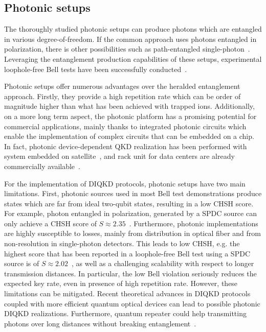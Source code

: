 \subsection{Photonic setups}

The thoroughly studied photonic setups can produce photons which are entangled in various degree-of-freedom.
If the common approach uses photons entangled in polarization, there is other possibilities such as path-entangled single-photon~\cite{Caspar2020}.
Leveraging the entanglement production capabilities of these setups, experimental loophole-free Bell tests have been successfully conducted~\cite{Giustina2015,Shalm2015,Li2018}.

Photonic setups offer numerous advantages over the heralded entanglement approach.
Firstly, they provide a high repetition rate which can be order of magnitude higher than what has been achieved with trapped ions.
Additionally, on a more long term aspect, the photonic platform has a promising potential for commercial applications, mainly thanks to integrated photonic circuits which enable the implementation of complex circuits that can be embedded on a chip.
In fact, photonic device-dependent QKD realization has been performed with system embedded on satellite~\cite{Liao2017}, and rack unit for data centers are already commercially available~\cite{Pljonkin2018}. 

For the implementation of DIQKD protocols, photonic setups have two main limitations.
First, photonic sources used in most Bell test demonstrations produce states which are far from ideal two-qubit states, resulting in a low CHSH score.
For example, photon entangled in polarization, generated by a SPDC source can only achieve a CHSH score of $S\approx 2.35$~\cite{Vivoli2015b}.
Furthermore, photonic implementations are highly susceptible to losses, mainly from distribution in optical fiber and from non-resolution in single-photon detectors.
This leads to low CHSH, e.g. the highest score that has been reported in a loophole-free Bell test using a SPDC source is of $S \approx 2.02$~\cite{Liu2021}, as well as a challenging scalability with respect to longer transmission distances.
In particular, the low Bell violation seriously reduces the expected key rate, even in presence of high repetition rate.
However, these limitations can be mitigated.
Recent theoretical advances in DIQKD protocols coupled with more efficient quantum optical devices can lead to possible photonic DIQKD realizations.
Furthermore, quantum repeater could help transmitting photons over long distances without breaking entanglement~\cite{Sangouard2011}.

